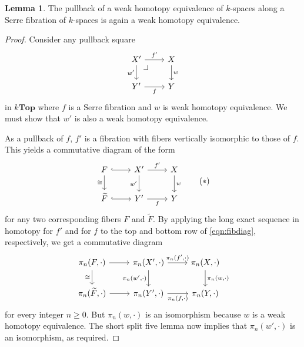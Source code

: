 \documentclass[10pt,letterpaper,cm]{nupset}
\theoremstyle{definition}
\theoremstyle{theorem}
\newtheorem{lemma}[definition]{Lemma}
\theoremstyle{remark}
\newcommand{\0}{\mathbf{0}}
\newcommand{\1}{\mathbf{1}}
\newcommand{\2}{\mathbf{2}}
\begin{document}
\begin{lemma}\label{Toprp}
The pullback of a weak homotopy equivalence of $k$-spaces along a Serre fibration of $k$-spaces is again a weak homotopy equivalence. 
\end{lemma}
\begin{proof}
Consider any pullback square
\[
\begin{tikzcd}
X' \arrow[r, "f'"]
\arrow[dr, phantom, "\scalebox{1.5}{\color{black}$\lrcorner$}" , very near start, color=black]
 \arrow[d, "w'"'] & X \arrow[d, "w"] \\
Y' \arrow[r, "f"']            & Y               
\end{tikzcd}
\] in $k\mathbf{Top}$ where $f$ is a Serre fibration and $w$ is weak homotopy equivalence. We must show that $w'$ is also a weak homotopy equivalence. 

\smallskip

As a pullback of $f$, $f'$ is a fibration with fibers vertically isomorphic to those of $f$. This yields a commutative diagram of the form
\[ \label{eqn:fibdiag}
\begin{tikzcd}
F \arrow[r, hook] \arrow[d, "\cong"'] & X' \arrow[d, "w'"'] \arrow[r, "f'"] & X \arrow[d, "w"] \\
\widetilde{F} \arrow[r, hook]         & Y' \arrow[r, "f"']                  & Y               
\end{tikzcd} \tag{$\ast$}
\] for any two corresponding fibers $F$ and $\widetilde{F}$. By applying the long exact sequence in homotopy for $f'$ and for $f$ to the top and bottom row  of \eqref{eqn:fibdiag}, respectively, we get a commutative diagram
\[
\begin{tikzcd}
{\pi_n(F, {\cdot})} \arrow[r] \arrow[d, "\cong"'] & {\pi_n(X', {\cdot})} \arrow[d, "{\pi_n(w', {\cdot})}"'] \arrow[r, "{\pi_n(f', {\cdot})}"] & {\pi_n(X, {\cdot})} \arrow[d, "{\pi_n(w, {\cdot})}"] \\
{\pi_n(\widetilde{F}, {\cdot})} \arrow[r]         & {\pi_n(Y', {\cdot})} \arrow[r, "{\pi_n(f, {\cdot})}"']                                    & {\pi_n(Y, {\cdot})}                                 
\end{tikzcd}
\] for every integer $n\geq 0$. But $\pi_n(w, {\cdot})$ is an isomorphism because $w$ is a weak homotopy equivalence. The short split five lemma now implies that $\pi_n(w', {\cdot})$ is an isomorphism, as required.
\end{proof}
\end{document}
